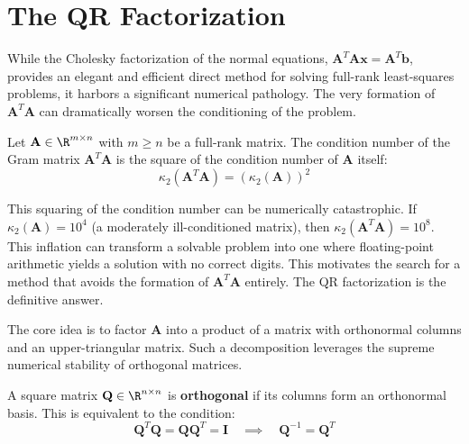 
\section{The QR Factorization}

While the Cholesky factorization of the normal equations, $\mathbf{A}^T\mathbf{A}\mathbf{x} = \mathbf{A}^T\mathbf{b}$, provides an elegant and efficient direct method for solving full-rank least-squares problems, it harbors a significant numerical pathology. The very formation of $\mathbf{A}^T\mathbf{A}$ can dramatically worsen the conditioning of the problem.

\begin{theorem}
Let $\mathbf{A} \in \R^{m \times n}$ with $m \ge n$ be a full-rank matrix. The condition number of the Gram matrix $\mathbf{A}^T\mathbf{A}$ is the square of the condition number of $\mathbf{A}$ itself:
\[ \kappa_2(\mathbf{A}^T\mathbf{A}) = (\kappa_2(\mathbf{A}))^2 \]
\end{theorem}
\begin{remark}
This squaring of the condition number can be numerically catastrophic. If $\kappa_2(\mathbf{A}) = 10^4$ (a moderately ill-conditioned matrix), then $\kappa_2(\mathbf{A}^T\mathbf{A}) = 10^8$. This inflation can transform a solvable problem into one where floating-point arithmetic yields a solution with no correct digits. This motivates the search for a method that avoids the formation of $\mathbf{A}^T\mathbf{A}$ entirely. The QR factorization is the definitive answer.
\end{remark}

The core idea is to factor $\mathbf{A}$ into a product of a matrix with orthonormal columns and an upper-triangular matrix. Such a decomposition leverages the supreme numerical stability of orthogonal matrices.

\begin{definition}
A square matrix $\mathbf{Q} \in \R^{n \times n}$ is \textbf{orthogonal} if its columns form an orthonormal basis. This is equivalent to the condition:
\[ \mathbf{Q}^T\mathbf{Q} = \mathbf{Q}\mathbf{Q}^T = \mathbf{I} \quad \implies \quad \mathbf{Q}^{-1} = \mathbf{Q}^T \]
\end{definition}

